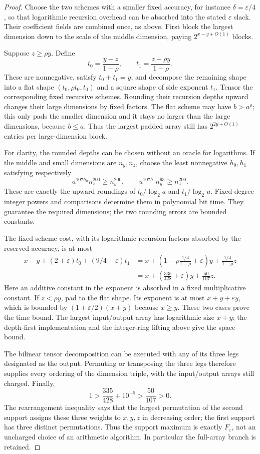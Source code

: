 \begin{proof}
Choose the two schemes with a smaller fixed accuracy, for instance
$\delta=\varepsilon/4$, so that logarithmic recursion overhead can be
absorbed into the stated $\varepsilon$ slack. Their coefficient fields
are combined once, as above. First block the largest dimension down to
the scale of the middle dimension, paying $2^{x-y+O(1)}$ blocks.

Suppose $z\geq\rho y$. Define
\[
 t_0=\frac{y-z}{1-\rho},\qquad
 t_1=\frac{z-\rho y}{1-\rho}.
\]
These are nonnegative, satisfy $t_0+t_1=y$, and decompose the remaining
shape into a flat shape $(t_0,\rho t_0,t_0)$ and a square shape of
side exponent $t_1$. Tensor the corresponding fixed recursive schemes.
Rounding their recursion depths upward changes their large dimensions
by fixed factors. The flat scheme may have $b>a^\rho$; this only pads
the smaller dimension and it stays no larger than the large dimensions,
because $b\leq a$. Thus the largest padded array still has
$2^{2y+O(1)}$ entries per large-dimension block.

For clarity, the rounded depths can be chosen without an oracle for
logarithms. If the middle and small dimensions are $n_y,n_z$, choose the
least nonnegative $h_0,h_1$ satisfying respectively
\[
 a^{107h_0}n_z^{200}\geq n_y^{200},\qquad
 u^{107h_1}n_y^{93}\geq n_z^{200}.
\]
These are exactly the upward roundings of $t_0/\log_2 a$ and
$t_1/\log_2 u$. Fixed-degree integer powers and comparisons determine
them in polynomial bit time. They guarantee the required dimensions;
the two rounding errors are bounded constants.

The fixed-scheme cost, with its logarithmic recursion factors absorbed
by the reserved accuracy, is at most
\begin{align*}
 x-y+(2+\varepsilon)t_0+(9/4+\varepsilon)t_1
 &=x+\left(1-\rho\frac{1/4}{1-\rho}
                  +\varepsilon\right)y+
                  \frac{1/4}{1-\rho}z\\
 &=x+\left(\frac{335}{428}+\varepsilon\right)y+
                  \frac{50}{107}z.
\end{align*}
Here an additive constant in the exponent is absorbed in a fixed
multiplicative constant. If $z<\rho y$, pad to the flat shape. Its
exponent is at most $x+y+\varepsilon y$, which is bounded by
$(1+\varepsilon/2)(x+y)$ because $x\geq y$. These two cases prove the
time bound. The largest input/output array has logarithmic size $x+y$;
the depth-first implementation and the integer-ring lifting above give
the space bound.

The bilinear tensor decomposition can be executed with any of its three
legs designated as the output. Permuting or transposing the three legs
therefore supplies every ordering of the dimension triple, with the
input/output arrays still charged. Finally,
\[
 1>\frac{335}{428}+10^{-5}>\frac{50}{107}>0.
\]
The rearrangement inequality says that the largest permutation of the
second support assigns these three weights to $x,y,z$ in decreasing
order; the first support has three distinct permutations. Thus the
support maximum is exactly $F_\varepsilon$, not an uncharged choice of
an arithmetic algorithm. In particular the full-array branch is retained.
\end{proof}

